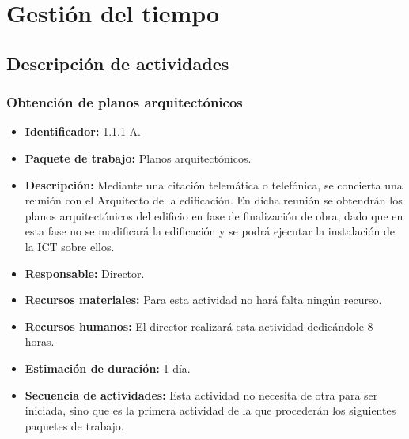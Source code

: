 \chapter{Gestión del tiempo}

\section{Descripción de actividades}


\subsection{Obtención de planos arquitectónicos}
\begin{itemize}
\item \textbf{Identificador: }1.1.1 A.
\item \textbf{Paquete de trabajo: }Planos arquitectónicos.
\item \textbf{Descripción: }Mediante una citación telemática o telefónica, se concierta una reunión con el Arquitecto de la edificación. En dicha reunión se obtendrán los planos arquitectónicos del edificio en fase de finalización de obra, dado que en esta fase no se modificará la edificación y se podrá ejecutar la instalación de la ICT sobre ellos.
\item \textbf{Responsable: }Director.
\item \textbf{Recursos materiales: }Para esta actividad no hará falta ningún recurso.
\item \textbf{Recursos humanos: }El director realizará esta actividad dedicándole 8 horas.
\item \textbf{Estimación de duración: }1 día.
\item \textbf{Secuencia de actividades: }Esta actividad no necesita de otra para ser iniciada, sino que es la primera actividad de la que procederán los siguientes paquetes de trabajo.
\end{itemize}

